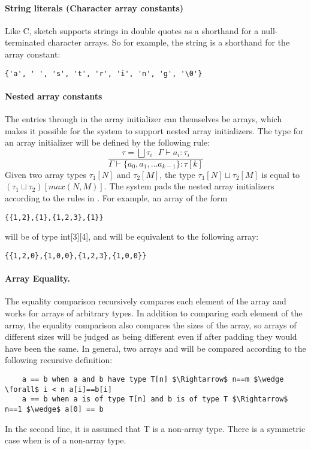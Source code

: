 \paragraph{String literals (Character array constants)}
Like C, sketch supports strings in double quotes as a shorthand for a null-terminated character arrays. So for example, the string  is a shorthand for the array constant:
\begin{lstlisting}
{'a', ' ', 's', 't', 'r', 'i', 'n', 'g', '\0'}
\end{lstlisting}


\paragraph{Nested array constants}
The entries  through  in the array initializer can themselves be arrays, which makes it possible for the system to support nested array initializers. The type for an array initializer will be defined by the following rule:
\[
	\frac{\tau = \bigsqcup \tau_i~~~ \Gamma\vdash a_i:\tau_i }{\Gamma \vdash \{a_0, a_1, \ldots a_{k-1}\}:\tau[k]}
\]
Given two array types $\tau_1[N]$ and $\tau_2[M]$, the type $\tau_1[N] \sqcup \tau_2[M]$ is equal to $(\tau_1 \sqcup \tau_2)[max(N,M)]$. The system pads the nested array initializers according to the rules in . For example, an array of the form
\begin{lstlisting}
{{1,2},{1},{1,2,3},{1}}
\end{lstlisting}
will be of type int[3][4], and will be equivalent to the following array:
\begin{lstlisting}
{{1,2,0},{1,0,0},{1,2,3},{1,0,0}}
\end{lstlisting}


\paragraph{Array Equality.} The equality comparison recursively compares each element of the array and works for arrays of arbitrary types. In addition to comparing each element of the array, the equality comparison also compares the sizes of the array, so arrays of different sizes will be judged as being different even if after padding they would have been the same.
In general, two arrays  and  will be compared according to the following recursive definition:

\begin{lstlisting}
	a == b when a and b have type T[n] $\Rightarrow$ n==m $\wedge \forall$ i < n a[i]==b[i]
	a == b when a is of type T[n] and b is of type T $\Rightarrow$ n==1 $\wedge$ a[0] == b
\end{lstlisting}
In the second line, it is assumed that T is a non-array type. There is a symmetric case when  is of a non-array type.


